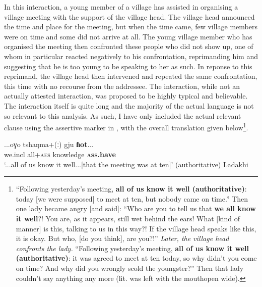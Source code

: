In this interaction, a young member of a village has assisted in organising a village meeting with the support of the village head. The village head announced the time and place for the meeting, but when the time came, few village members were on time and some did not arrive at all. The young village member who has organised the meeting then confronted these people who did not show up, one of whom in particular reacted negatively to his confrontation, reprimanding him and suggesting that he is too young to be speaking to her as such. In reponse to this reprimand, the village head then intervened and repeated the same confrontation, this time with no recourse from the addressee. The interaction, while not an actually attested interaction, was proposed to be highly typical and believable. The interaction itself is quite long and the majority of the actual language is not so relevant to this analysis. As such, I have only included the actual relevant clause using the assertive marker in , with the overall translation given below\footnote{``Following yesterday's meeting, \textbf{all of us know it well (authoritative)}: today [we were supposed] to meet at ten, but nobody came on time.'' Then one lady became angry [and said]: ``Who are you to tell us that \textbf{we all know it well}?! You are, as it appears, still wet behind the ears! What [kind of manner] is this, talking to us in this way?! If the village head speaks like this, it is okay. But who, [do you think], are you?!'' \textit{Later, the village head confronts the lady.} ``Following yesterday's meeting, \textbf{all of us know it well (authoritative)}: it was agreed to meet at ten today, so why didn't you come on time? And why did you wrongly scold the youngster?'' Then that lady couldn't say anything any more (lit. was left with the mouthopen wide).\cite[77]{ZeislerForthcoming}}.

\begin{exe}
    \ex\label{e:Discussion:Ladakhi}
    \gll ...oɣo tshaŋma+(ː) gju \textbf{ɦot}... \\
    we.incl all+\textsc{aes} knowledge \textbf{\textsc{ass}.have} \\
    \glt `...all of us know it well...[that the meeting was at ten]' (authoritative)
    Ladakhi \cite[Tibetic:India,][77]{ZeislerForthcoming}
\end{exe}

